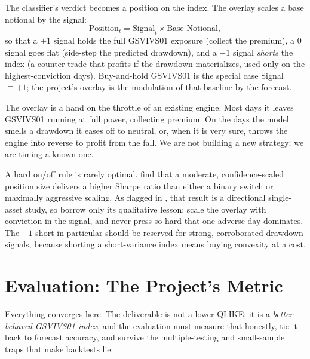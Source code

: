 The classifier's verdict becomes a position on the index. The overlay scales a base notional by the signal:
\begin{equation}
\label{eq:gsvivs:position}
\text{Position}_t = \text{Signal}_t \times \text{Base Notional},
\end{equation}
so that a $+1$ signal holds the full GSVIVS01 exposure (collect the premium), a $0$ signal goes flat (side-step the predicted drawdown), and a $-1$ signal \emph{shorts} the index (a counter-trade that profits if the drawdown materializes, used only on the highest-conviction days). Buy-and-hold GSVIVS01 is the special case Signal $\equiv +1$; the project's overlay is the modulation of that baseline by the forecast.

\begin{intuition}
The overlay is a hand on the throttle of an existing engine. Most days it leaves GSVIVS01 running at full power, collecting premium. On the days the model smells a drawdown it eases off to neutral, or, when it is very sure, throws the engine into reverse to profit from the fall. We are not building a new strategy; we are timing a known one.
\end{intuition}

\begin{warning}
A hard on/off rule is rarely optimal. \citet{LiWu2026} find that a moderate, confidence-scaled position size delivers a higher Sharpe ratio than either a binary switch or maximally aggressive scaling. As flagged in , that result is a directional single-asset study, so borrow only its qualitative lesson: scale the overlay with conviction in the signal, and never press so hard that one adverse day dominates. The $-1$ short in particular should be reserved for strong, corroborated drawdown signals, because shorting a short-variance index means buying convexity at a cost.
\end{warning}

\section{Evaluation: The Project's Metric}
\label{sec:gsvivs:evaluation}

Everything converges here. The deliverable is not a lower QLIKE; it is a \emph{better-behaved GSVIVS01 index}, and the evaluation must measure that honestly, tie it back to forecast accuracy, and survive the multiple-testing and small-sample traps that make backtests lie.

